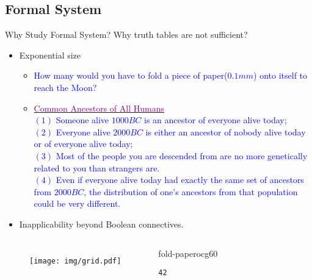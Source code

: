 \documentclass[aspectratio=43,11pt,UTF8,colorlinks,compress]{beamer} %
\begin{document}
\subsection{Formal System}

\begin{frame}[fragile]{Why Study Formal System?}
	Why truth tables are not sufficient?
	\begin{itemize}
		\item Exponential size
		\begin{itemize}
			\item \textcolor{blue}{How many  would you have to fold a piece of paper($0.1mm$) onto itself to reach the Moon?}
			\item \href{http://nautil.us/blog/we-are-all-princes-paupers-and-part-of-the-human-family}{\textcolor{purple}{Common Ancestors of All Humans}}\\
			\textcolor{blue}{$(1)$ Someone alive $1000BC$ is an ancestor of everyone alive today;\\
				$(2)$ Everyone alive $2000BC$ is either an ancestor of nobody alive today or of everyone alive today;\\
				$(3)$ Most of the people you are descended from are no more genetically related to you than strangers are.\\
				$(4)$ Even if everyone alive today had exactly the same set of ancestors from $2000BC$, the distribution of one's ancestors from that population could be very different.}
		\end{itemize}
		\item Inapplicability beyond Boolean connectives.
	\end{itemize}
\begin{columns}
	\begin{figure}[H]
	\texttt{[image: img/grid.pdf]}
	\end{figure}
\begin{ocg}{fold-paper}{ocg6}{0}
\begin{verbatim}
42
\end{verbatim}
\end{ocg}
\end{columns}
\end{frame}
\end{document}
